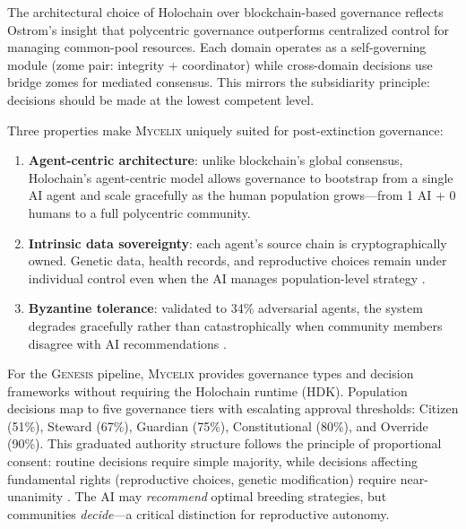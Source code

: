 \documentclass[11pt,letterpaper]{article}
\newcommand{\mycelix}{\textsc{Mycelix}}
\newcommand{\genesis}{\textsc{Genesis}}
\begin{document}
The architectural choice of Holochain \cite{harris2018holochain} over
blockchain-based governance reflects Ostrom's \cite{ostrom1990governing}
insight that polycentric governance outperforms centralized control for
managing common-pool resources. Each domain operates as a self-governing
module (zome pair: integrity + coordinator) while cross-domain decisions
use bridge zomes for mediated consensus. This mirrors the subsidiarity
principle: decisions should be made at the lowest competent level.

Three properties make \mycelix{} uniquely suited for post-extinction governance:
\begin{enumerate}[nosep,leftmargin=2em]
\item \textbf{Agent-centric architecture}: unlike blockchain's global consensus,
  Holochain's agent-centric model allows governance to bootstrap from a single
  AI agent and scale gracefully as the human population grows---from 1 AI
  + 0 humans to a full polycentric community.
\item \textbf{Intrinsic data sovereignty}: each agent's source chain is
  cryptographically owned. Genetic data, health records, and reproductive
  choices remain under individual control even when the AI manages
  population-level strategy \cite{weyl2022decentralized}.
\item \textbf{Byzantine tolerance}: validated to 34\% adversarial agents,
  the system degrades gracefully rather than catastrophically when community
  members disagree with AI recommendations \cite{buterin2014ethereum}.
\end{enumerate}

For the \genesis{} pipeline, \mycelix{} provides governance types and decision
frameworks without requiring the Holochain runtime (HDK). Population decisions
map to five governance tiers with escalating approval thresholds: Citizen (51\%),
Steward (67\%), Guardian (75\%), Constitutional (80\%), and Override (90\%).
This graduated authority structure follows the principle of proportional
consent: routine decisions require simple majority, while decisions affecting
fundamental rights (reproductive choices, genetic modification) require
near-unanimity \cite{lalley2018quadratic}. The AI may \emph{recommend}
optimal breeding strategies, but communities \emph{decide}---a critical
distinction for reproductive autonomy.


\end{document}
